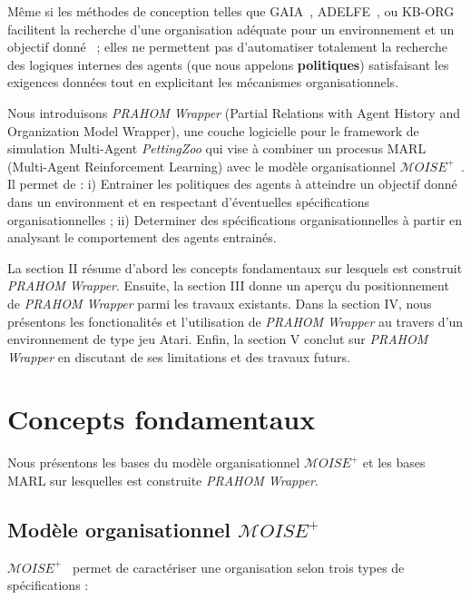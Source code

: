 \documentclass[demonstration]{jfsma}
\begin{document}
Même si les méthodes de conception telles que GAIA~\cite{Wooldridge2000,Cernuzzi2014}, ADELFE~\cite{Mefteh2015},
ou KB-ORG~\cite{Sims2008} facilitent la recherche d'une organisation adéquate pour un environnement et un objectif donné~\cite{Mefteh2013} ; elles ne permettent pas d'automatiser totalement la recherche des logiques internes des agents (que nous appelons \textbf{politiques}) satisfaisant les exigences données tout en explicitant les mécanismes organisationnels.

Nous introduisons \emph{PRAHOM Wrapper} (Partial Relations with Agent History and Organization Model Wrapper), une couche logicielle pour le framework de simulation Multi-Agent \emph{PettingZoo} qui vise à combiner un procesus MARL (Multi-Agent Reinforcement Learning) avec le modèle organisationnel $\mathcal{M}OISE^+$~\cite{Hubner2007}. Il permet de :
%
i) Entrainer les politiques des agents à atteindre un objectif donné dans un environment et en respectant d'éventuelles spécifications organisationnelles ;\quad
ii) Determiner des spécifications organisationnelles à partir en analysant le comportement des agents entrainés.

La section II résume d'abord les concepts fondamentaux sur lesquels est construit \emph{PRAHOM Wrapper}.
Ensuite, la section III donne un aperçu du positionnement de \emph{PRAHOM Wrapper} parmi les travaux existants.
Dans la section IV, nous présentons les fonctionalités et l'utilisation de \emph{PRAHOM Wrapper} au travers d'un environnement de type jeu Atari. Enfin, la section V conclut sur \emph{PRAHOM Wrapper} en discutant de ses limitations et des travaux futurs.


\section{Concepts fondamentaux}

Nous présentons les bases du modèle organisationnel $\mathcal{M}OISE^+$ et les bases MARL sur lesquelles est construite \emph{PRAHOM Wrapper}.

\subsection{Modèle organisationnel $\mathcal{M}OISE^+$}

$\mathcal{M}OISE^+$~\cite{Hubner2007} permet de caractériser une organisation selon trois types de spécifications :
\end{document}
